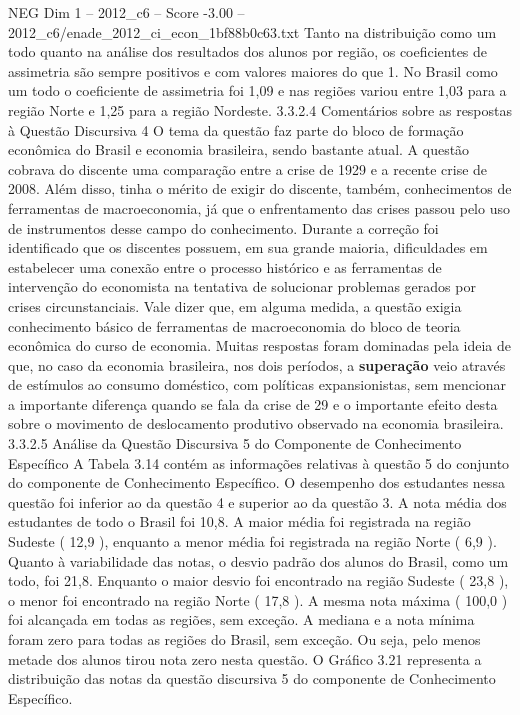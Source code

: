 \begin{textsample}{NEG Dim 1 – 2012\_c6 – Score -3.00 – 2012\_c6/enade\_2012\_ci\_econ\_1bf88b0c63.txt}
Tanto na distribuição como um todo quanto na análise dos resultados dos alunos por região, os coeficientes de assimetria são sempre positivos e com valores maiores do que 1.
No Brasil como um todo o coeficiente de assimetria foi 1,09 e nas regiões variou entre 1,03 para a região Norte e 1,25 para a região Nordeste. 3.3.2.4 Comentários sobre as respostas à Questão Discursiva 4 O tema da questão faz parte do bloco de formação econômica do Brasil e economia brasileira, sendo bastante atual.
A questão cobrava do discente uma comparação entre a crise de 1929 e a recente crise de 2008.
Além disso, tinha o mérito de exigir do discente, também, conhecimentos de ferramentas de macroeconomia, já que o enfrentamento das crises passou pelo uso de instrumentos desse campo do conhecimento.
Durante a correção foi identificado que os discentes possuem, em sua grande maioria, dificuldades em estabelecer uma conexão entre o processo histórico e as ferramentas de intervenção do economista na tentativa de solucionar problemas gerados por crises circunstanciais.
Vale dizer que, em alguma medida, a questão exigia conhecimento básico de ferramentas de macroeconomia do bloco de teoria econômica do curso de economia.
Muitas respostas foram dominadas pela ideia de que, no caso da economia brasileira, nos dois períodos, a \textbf{superação} veio através de estímulos ao consumo doméstico, com políticas expansionistas, sem mencionar a importante diferença quando se fala da crise de 29 e o importante efeito desta sobre o movimento de deslocamento produtivo observado na economia brasileira. 3.3.2.5 Análise da Questão Discursiva 5 do Componente de Conhecimento Específico A Tabela 3.14 contém as informações relativas à questão 5 do conjunto do componente de Conhecimento Específico.
O desempenho dos estudantes nessa questão foi inferior ao da questão 4 e superior ao da questão 3.
A nota média dos estudantes de todo o Brasil foi 10,8.
A maior média foi registrada na região Sudeste ( 12,9 ), enquanto a menor média foi registrada na região Norte ( 6,9 ).
Quanto à variabilidade das notas, o desvio padrão dos alunos do Brasil, como um todo, foi 21,8.
Enquanto o maior desvio foi encontrado na região Sudeste ( 23,8 ), o menor foi encontrado na região Norte ( 17,8 ).
A mesma nota máxima ( 100,0 ) foi alcançada em todas as regiões, sem exceção.
A mediana e a nota mínima foram zero para todas as regiões do Brasil, sem exceção.
Ou seja, pelo menos metade dos alunos tirou nota zero nesta questão.
O Gráfico 3.21 representa a distribuição das notas da questão discursiva 5 do componente de Conhecimento Específico.

\end{textsample}
